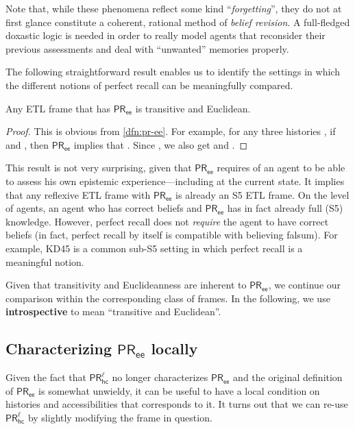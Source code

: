 \documentclass{article}
\newcommand{\PRhcl}{\ensuremath{\mathsf{PR_{hc}^\ell}}\xspace}
\newcommand{\PRee}{\ensuremath{\mathsf{PR_{ee}}}\xspace}
\def\dfn{\textbf}
\newcounter{#1}
\begin{document}
Note that, while these phenomena reflect some kind ``\emph{forgetting}'',
they do not at first glance constitute a coherent, rational method of \emph{belief revision}.
A full-fledged doxastic logic is needed in order to really model agents
that reconsider their previous assessments and deal with ``unwanted'' memories properly.

\bigskip

The following straightforward result enables us to identify the settings
in which the different notions of perfect recall can be meaningfully compared.

\begin{proposition}
\label{result:pr-ee-implies-45}
  Any ETL frame that has \PRee is transitive and Euclidean.
\end{proposition}
\begin{proof}
  This is obvious from \cref{dfn:pr-ee}.
  For example, for any three histories , if  and ,
  then \PRee implies that .
  Since , we also get  and .
\end{proof}

This result is not very surprising, given that \PRee
requires of an agent to be able to assess his own epistemic experience---including at the current state.
It implies that any reflexive ETL frame with \PRee is already an S5 ETL frame.
On the level of agents, an agent who has correct beliefs and \PRee
has in fact already full (S5) knowledge.
However, perfect recall does not \emph{require} the agent to have correct beliefs
(in fact, perfect recall by itself is compatible with believing falsum).
For example, KD45 is a common sub-S5 setting in which perfect recall is a meaningful notion.

Given that transitivity and Euclideanness are inherent to \PRee,
we continue our comparison within the corresponding class of frames.
In the following, we use \dfn{introspective} to mean ``transitive and Euclidean''.

\subsection{Characterizing \PRee locally}
\label{sec:intr-sett}

Given the fact that \PRhcl no longer characterizes \PRee
and the original definition of \PRee is somewhat unwieldy,
it can be useful to have a local condition on histories and accessibilities that corresponds to it.
It turns out that we can re-use \PRhcl by slightly modifying the frame in question.
\end{document}
